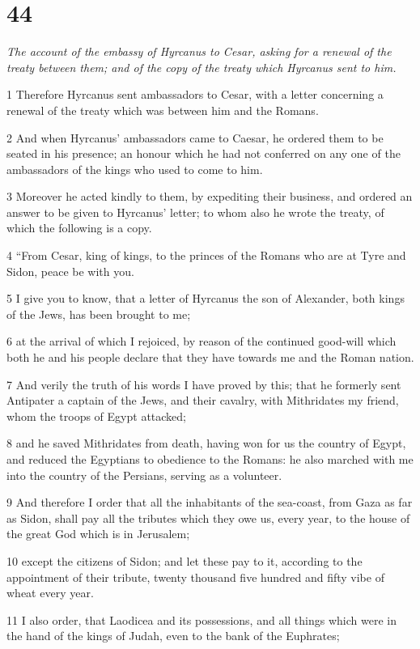 \chapter{44}

\par \textit{The account of the embassy of Hyrcanus to Cesar, asking for a renewal of the treaty between them; and of the copy of the treaty which Hyrcanus sent to him.}

1 Therefore Hyrcanus sent ambassadors to Cesar, with a letter concerning a renewal of the treaty which was between him and the Romans. 

2 And when Hyrcanus’ ambassadors came to Caesar, he ordered them to be seated in his presence; an honour which he had not conferred on any one of the ambassadors of the kings who used to come to him. 

3 Moreover he acted kindly to them, by expediting their business, and ordered an answer to be given to Hyrcanus’ letter; to whom also he wrote the treaty, of which the following is a copy. 

4 “From Cesar, king of kings, to the princes of the Romans who are at Tyre and Sidon, peace be with you. 

5 I give you to know, that a letter of Hyrcanus the son of Alexander, both kings of the Jews, has been brought to me; 

6 at the arrival of which I rejoiced, by reason of the continued good-will which both he and his people declare that they have towards me and the Roman nation. 

7 And verily the truth of his words I have proved by this; that he formerly sent Antipater a captain of the Jews, and their cavalry, with Mithridates my friend, whom the troops of Egypt attacked; 

8 and he saved Mithridates from death, having won for us the country of Egypt, and reduced the Egyptians to obedience to the Romans: he also marched with me into the country of the Persians, serving as a volunteer. 

9 And therefore I order that all the inhabitants of the sea-coast, from Gaza as far as Sidon, shall pay all the tributes which they owe us, every year, to the house of the great God which is in Jerusalem; 

10 except the citizens of Sidon; and let these pay to it, according to the appointment of their tribute, twenty thousand five hundred and fifty vibe of wheat every year. 

11 I also order, that Laodicea and its possessions, and all things which were in the hand of the kings of Judah, even to the bank of the Euphrates; 

